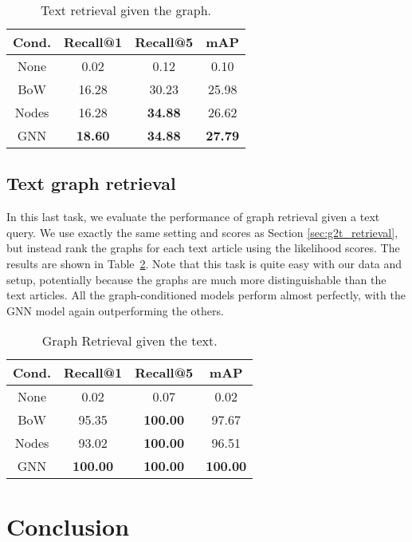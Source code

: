 \documentclass[11pt]{article}
\newcommand{\secref}[1]{Section \ref{#1}}
\begin{document}
\begin{table}[t]
    \centering
    \begin{tabular}{c|c|c|c}
    \hline
        Cond. & Recall@1 & Recall@5 & mAP \\
        \hline
        None & 0.02 & 0.12 & 0.10 \\
        BoW & 16.28 & 30.23 & 25.98 \\
        Nodes & 16.28 & \textbf{34.88} & 26.62 \\
        GNN & \textbf{18.60} & \textbf{34.88} & \textbf{27.79} \\
        \hline
    \end{tabular}
    \caption{Text retrieval given the graph.
}
    \label{tab:graph2text-retrieval}
\end{table}


\subsection{Text  graph retrieval}
In this last task, we evaluate the performance of graph retrieval given a text query.  We use exactly the same setting and scores as \secref{sec:g2t_retrieval}, but instead rank the graphs for each text article using the likelihood scores.
The results are shown in Table~\ref{tab:text2graph}. Note that this task is quite easy with our data and setup, potentially because the graphs are much more distinguishable than the text articles. All the graph-conditioned models perform almost perfectly, with the GNN model again outperforming the others.


\begin{table}[t]
    \centering
    \begin{tabular}{c|c|c|c}
    \hline
        Cond. & Recall@1 & Recall@5 & mAP \\
        \hline
        None & 0.02 & 0.07 & 0.02 \\
        BoW & 95.35 & \textbf{100.00} & 97.67 \\
        Nodes & 93.02 & \textbf{100.00} & 96.51 \\
        GNN & \textbf{100.00} & \textbf{100.00} & \textbf{100.00} \\
        \hline
    \end{tabular}
    \caption{Graph Retrieval given the text.}
    \label{tab:text2graph}
\end{table}

\section{Conclusion}
\end{document}
